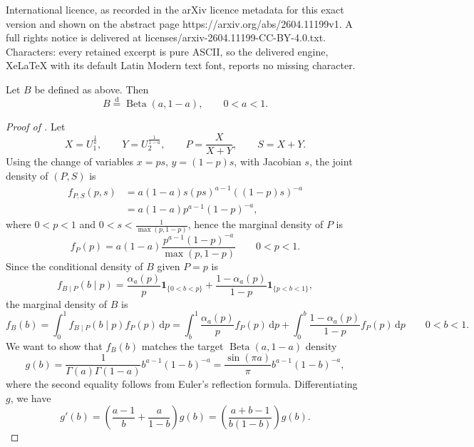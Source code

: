 \documentclass[10pt,a4paper]{amsart}
\newcommand{\eqdist}{\mathrel{\overset{\mathrm{d}}{=}}}
\begin{document}
International licence, as recorded in the arXiv licence metadata for this exact version and shown on the abstract page https://arxiv.org/abs/2604.11199v1. A full rights notice is delivered at licenses/arxiv-2604.11199-CC-BY-4.0.txt. Characters: every retained excerpt is pure ASCII, so the delivered engine, XeLaTeX with its default Latin Modern text font, reports no missing character.
\begin{theorem}
\label{thm:beta-law}
Let $B$ be defined as above. Then
\[
  B \eqdist \operatorname{Beta}(a,1-a), \qquad 0<a<1.
\]
\end{theorem}

\begin{proof}[Proof of ]
Let
\[
  X=U_1^{\frac{1}{a}},
  \qquad
  Y=U_2^{\frac{1}{1-a}},
  \qquad
  P=\frac{X}{X+Y},
  \qquad
  S=X+Y.
\]
Using the change of variables $x=ps$, $y=(1-p)s$, with Jacobian $s$, the joint density of $(P,S)$ is
\[
  \begin{aligned}
    f_{P,S}(p,s)
      &= a(1-a)s(ps)^{a-1}((1-p)s)^{-a} \\
      &= a(1-a)p^{a-1}(1-p)^{-a},
  \end{aligned}
\]
where $0<p<1$ and $0<s<\frac{1}{\max(p,1-p)}$, hence the marginal density of $P$ is
\begin{equation}
f_P(p)= a(1-a)\frac{p^{a-1}(1-p)^{-a}}{\max(p,1-p)}
\qquad 0<p<1.
\label{eq:fp-marginal}
\end{equation}
Since the conditional density of $B$ given $P=p$ is
\[
 f_{B \mid P}(b \mid p) = \frac{\alpha_a(p)}{p}\mathbf{1}_{\{0<b<p\}} + \frac{1-\alpha_a(p)}{1-p}\mathbf{1}_{\{p<b<1\}},
\]
the marginal density of $B$ is 
\begin{equation}
f_B(b)= \int_0^1 f_{B \mid P}(b \mid p)f_P(p)\,\mathrm{d}p = \int_b^1 \frac{\alpha_a(p)}{p}f_P(p)\,\mathrm{d}p + \int_0^b\frac{1-\alpha_a(p)}{1-p}f_P(p)\,\mathrm{d}p
\qquad 0<b<1.
\label{eq:fb-marginal}
\end{equation}
We want to show that $f_B(b)$ matches the target $\operatorname{Beta}(a,1-a)$ density
\begin{equation}
g(b) = \frac{1}{\Gamma(a)\Gamma(1-a)}b^{a-1}(1-b)^{-a} = \frac{\sin(\pi a)}{\pi}b^{a-1}(1-b)^{-a},
\label{eq:beta-density}
\end{equation}
where the second equality follows from Euler's reflection formula.
Differentiating $g$, we have
\begin{equation}
  g'(b)= \left(\frac{a-1}{b}+\frac{a}{1-b}\right)g(b)= \left(\frac{a+b-1}{b(1-b)}\right)g(b).
\label{eq:beta-deriv}

\end{equation}
\end{proof}
\end{document}
